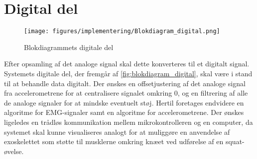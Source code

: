 \section{Digital del} \label{sec:digital_del_krav}
\begin{figure}[H]
\centering
\texttt{[image: figures/implementering/Blokdiagram\_digital.png]}
\caption{Blokdiagrammets digitale del}
\label{fig:blokdiagram_digital}
\end{figure}

\noindent
Efter opsamling af det analoge signal skal dette konverteres til et digitalt signal. Systemets digitale del, der fremgår af \autoref{fig:blokdiagram_digital}, skal være i stand til at behandle data digitalt. Der ønskes en offsetjustering af det analoge signal fra accelerometrene for at centralisere signalet omkring 0, og en filtrering af alle de analoge signaler for at mindske eventuelt støj. Hertil foretages endvidere en algoritme for EMG-signaler samt en algoritme for accelerometrene. Der ønskes ligeledes en trådløs kommunikation mellem mikrokontrolleren og en computer, da systemet skal kunne visualiseres analogt for at muliggøre en anvendelse af exoskelettet som støtte til musklerne omkring knæet ved udførelse af en squat-øvelse.
